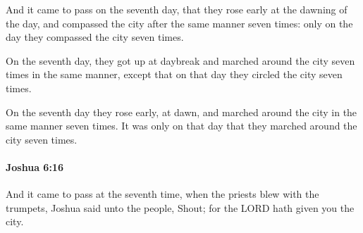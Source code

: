 			\begin{versebox}
					\item[BHS] 
					\item[ASV] And it came to pass on the seventh day, that they rose early at the dawning of the day, and compassed the city after the same manner seven times: only on the day they compassed the city seven times.
					\item[NIV] On the seventh day, they got up at daybreak and marched around the city seven times in the same manner, except that on that day they circled the city seven times.
					\item[NRSV] On the seventh day they rose early, at dawn, and marched around the city in the same manner seven times. It was only on that day that they marched around the city seven times.
			\end{versebox}

		\paragraph{Joshua 6:16} %
			\label{JOSHUA-6-16}

			And it came to pass at the seventh time, when the priests blew with the trumpets, Joshua said unto the people, Shout; for the LORD hath given you the city.

